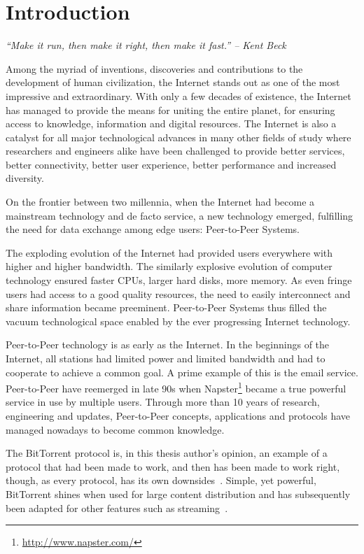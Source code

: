 
\chapter{Introduction}
\label{chapter:intro}

\textit{``Make it run, then make it right, then make it fast.'' -- Kent Beck}

Among the myriad of inventions, discoveries and contributions to the
development of human civilization, the Internet stands out as one of the
most impressive and extraordinary. With only a few decades of existence, the
Internet has managed to provide the means for uniting the entire planet, for
ensuring access to knowledge, information and digital resources. The Internet
is also a catalyst for all major technological advances in many other fields
of study where researchers and engineers alike have been challenged to provide
better services, better connectivity, better user experience, better
performance and increased diversity.

On the frontier between two millennia, when the Internet had become a
mainstream technology and de facto service, a new technology emerged,
fulfilling the need for data exchange among edge users: Peer-to-Peer Systems.

The exploding evolution of the Internet had provided users everywhere with
higher and higher bandwidth. The similarly explosive evolution of computer
technology ensured faster CPUs, larger hard disks, more memory. As even fringe
users had access to a good quality resources, the need to easily interconnect
and share information became preeminent. Peer-to-Peer Systems thus filled the
vacuum technological space enabled by the ever progressing Internet
technology.

Peer-to-Peer technology is as early as the Internet. In the beginnings of the
Internet, all stations had limited power and limited bandwidth and had to
cooperate to achieve a common goal. A prime example of this is the email
service. Peer-to-Peer have reemerged in late 90s when
Napster\footnote{\url{http://www.napster.com/}}
became a true powerful service in use by multiple users. Through more than 10
years of research, engineering and updates, Peer-to-Peer concepts,
applications and protocols have managed nowadays to become common knowledge.

The BitTorrent protocol is, in this thesis author's opinion, an example of a
protocol that had been made to work, and then has been made to work right,
though, as every protocol, has its own downsides~\cite{bittorrent-trade-offs}.
Simple, yet powerful, BitTorrent shines when used for large content
distribution and has subsequently been adapted for other features such as
streaming~\cite{bittorrent-streaming}.

